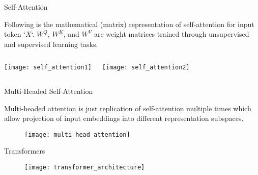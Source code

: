 \documentclass[10pt]{beamer}
\begin{document}
\begin{frame}[fragile]{Self-Attention}

	Following is the mathematical (matrix) representation of self-attention for input token `\(X\)`. \(W^Q\), \(W^K\), and
	\(W^V\) are weight matrices trained through unsupervised and supervised learning tasks.

	\begin{columns}[c]
		\begin{center}
			\texttt{[image: self\_attention1]}
		\end{center}
		\begin{center}
			\texttt{[image: self\_attention2]}
		\end{center}
	\end{columns}

\end{frame}

\begin{frame}[fragile]{Multi-Headed Self-Attention}

	Multi-headed attention is just replication of self-attention multiple times which allow projection of input
	embeddings into different representation subspaces.

	\begin{figure}[h]
		\centering
		\texttt{[image: multi\_head\_attention]}
	\end{figure}

\end{frame}

\begin{frame}[fragile]{Transformers}

	\begin{figure}[h]
		\centering
		\texttt{[image: transformer\_architecture]}
	\end{figure}

\end{frame}
\end{document}
